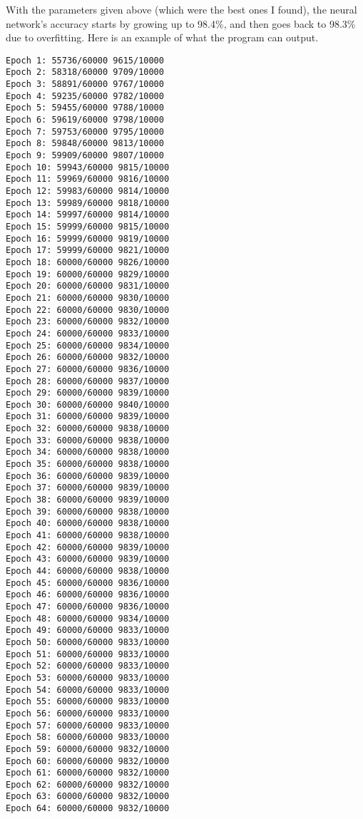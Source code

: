\documentclass{article}
\theoremstyle{definition}
\theoremstyle{remark}
\theoremstyle{example}
\begin{document}
With the parameters given above (which were the best ones I found), the neural network's accuracy starts by growing up to 98.4\%, and then goes back to 98.3\% due to overfitting. Here is an example of what the program can output.
\begin{lstlisting}[basicstyle=\scriptsize]
Epoch 1: 55736/60000 9615/10000
Epoch 2: 58318/60000 9709/10000
Epoch 3: 58891/60000 9767/10000
Epoch 4: 59235/60000 9782/10000
Epoch 5: 59455/60000 9788/10000
Epoch 6: 59619/60000 9798/10000
Epoch 7: 59753/60000 9795/10000
Epoch 8: 59848/60000 9813/10000
Epoch 9: 59909/60000 9807/10000
Epoch 10: 59943/60000 9815/10000
Epoch 11: 59969/60000 9816/10000
Epoch 12: 59983/60000 9814/10000
Epoch 13: 59989/60000 9818/10000
Epoch 14: 59997/60000 9814/10000
Epoch 15: 59999/60000 9815/10000
Epoch 16: 59999/60000 9819/10000
Epoch 17: 59999/60000 9821/10000
Epoch 18: 60000/60000 9826/10000
Epoch 19: 60000/60000 9829/10000
Epoch 20: 60000/60000 9831/10000
Epoch 21: 60000/60000 9830/10000
Epoch 22: 60000/60000 9830/10000
Epoch 23: 60000/60000 9832/10000
Epoch 24: 60000/60000 9833/10000
Epoch 25: 60000/60000 9834/10000
Epoch 26: 60000/60000 9832/10000
Epoch 27: 60000/60000 9836/10000
Epoch 28: 60000/60000 9837/10000
Epoch 29: 60000/60000 9839/10000
Epoch 30: 60000/60000 9840/10000
Epoch 31: 60000/60000 9839/10000
Epoch 32: 60000/60000 9838/10000
Epoch 33: 60000/60000 9838/10000
Epoch 34: 60000/60000 9838/10000
Epoch 35: 60000/60000 9838/10000
Epoch 36: 60000/60000 9839/10000
Epoch 37: 60000/60000 9839/10000
Epoch 38: 60000/60000 9839/10000
Epoch 39: 60000/60000 9838/10000
Epoch 40: 60000/60000 9838/10000
Epoch 41: 60000/60000 9838/10000
Epoch 42: 60000/60000 9839/10000
Epoch 43: 60000/60000 9839/10000
Epoch 44: 60000/60000 9838/10000
Epoch 45: 60000/60000 9836/10000
Epoch 46: 60000/60000 9836/10000
Epoch 47: 60000/60000 9836/10000
Epoch 48: 60000/60000 9834/10000
Epoch 49: 60000/60000 9833/10000
Epoch 50: 60000/60000 9833/10000
Epoch 51: 60000/60000 9833/10000
Epoch 52: 60000/60000 9833/10000
Epoch 53: 60000/60000 9833/10000
Epoch 54: 60000/60000 9833/10000
Epoch 55: 60000/60000 9833/10000
Epoch 56: 60000/60000 9833/10000
Epoch 57: 60000/60000 9833/10000
Epoch 58: 60000/60000 9833/10000
Epoch 59: 60000/60000 9832/10000
Epoch 60: 60000/60000 9832/10000
Epoch 61: 60000/60000 9832/10000
Epoch 62: 60000/60000 9832/10000
Epoch 63: 60000/60000 9832/10000
Epoch 64: 60000/60000 9832/10000
\end{lstlisting}


\newpage
\end{document}

